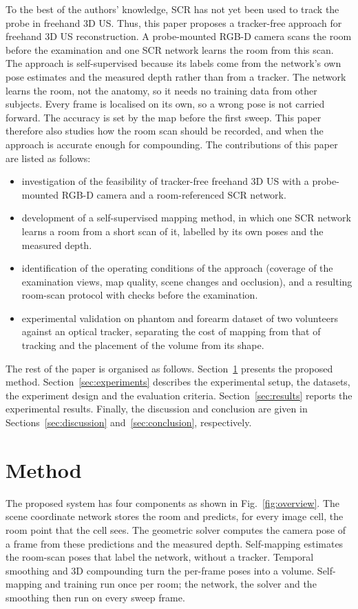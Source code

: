\documentclass[9pt,shortpaper,twoside,web]{ieeecolor2}
\begin{document}
To the best of the authors' knowledge, SCR has not yet been used to track the probe in freehand 3D US. Thus, this paper proposes a tracker-free approach for freehand 3D US reconstruction. A probe-mounted RGB-D camera scans the room before the examination and one SCR network learns the room from this scan. The approach is self-supervised because its labels come from the network's own pose estimates and the measured depth rather than from a tracker. The network learns the room, not the anatomy, so it needs no training data from other subjects. Every frame is localised on its own, so a wrong pose is not carried forward. The accuracy is set by the map before the first sweep. This paper therefore also studies how the room scan should be recorded, and when the approach is accurate enough for compounding. The contributions of this paper are listed as follows:
\begin{itemize}
  \item investigation of the feasibility of tracker-free freehand 3D US with a probe-mounted RGB-D camera and a room-referenced SCR network.
  \item development of a self-supervised mapping method, in which one SCR network learns a room from a short scan of it, labelled by its own poses and the measured depth.
  \item identification of the operating conditions of the approach (coverage of the examination views, map quality, scene changes and occlusion), and a resulting room-scan protocol with checks before the examination.
  \item experimental validation on phantom and forearm dataset of two volunteers against an optical tracker, separating the cost of mapping from that of tracking and the placement of the volume from its shape.
\end{itemize}
The rest of the paper is organised as follows. Section~\ref{sec:method} presents the proposed method. Section~\ref{sec:experiments} describes the experimental setup, the datasets, the experiment design and the evaluation criteria. Section~\ref{sec:results} reports the experimental results. Finally, the discussion and conclusion are given in Sections~\ref{sec:discussion} and~\ref{sec:conclusion}, respectively.




\section{Method}
\label{sec:method}
The proposed system has four components as shown in Fig.~\ref{fig:overview}. The scene coordinate network stores the room and predicts, for every image cell, the room point that the cell sees. The geometric solver computes the camera pose of a frame from these predictions and the measured depth. Self-mapping estimates the room-scan poses that label the network, without a tracker. Temporal smoothing and 3D compounding turn the per-frame poses into a volume. Self-mapping and training run once per room; the network, the solver and the smoothing then run on every sweep frame.
\end{document}
